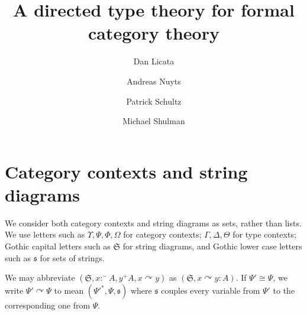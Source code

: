 \documentclass{amsart}
\title{A directed type theory for formal category theory}
\author{Dan Licata \and Andreas Nuyts \and Patrick Schultz \and Michael Shulman}
\def\p{^+} %
\def\m{^-}
\def\cat{\;\mathsf{cat}}
\def\flip#1{#1^*} %
\newcommand{\catctx}{\;\mathsf{catctx}}
\newcommand{\sdiag}{\;\mathsf{sdiag}}
\newcommand{\strs}[1]{\mathfrak{#1}}
\newcommand{\strto}{\curvearrowright}
\begin{document}
\maketitle

\section{Category contexts and string diagrams}
We consider both category contexts and string diagrams as sets, rather than lists. We use letters such as $\Upsilon, \Psi, \Phi, \Omega$ for category contexts; $\Gamma, \Delta, \Theta$ for type contexts; Gothic capital letters such as $\strs S$ for string diagrams, and Gothic lower case letters such as $\strs s$ for sets of strings.


We may abbreviate $(\strs S, x :\m A, y \p A, x \strto y)$ as $(\strs S, x \strto y : A)$. If $\Psi' \cong \Psi$, we write $\Psi' \strto \Psi$ to mean $(\flip{{\Psi'}}, \Psi, \strs s)$ where $\strs s$ couples every variable from $\Psi'$ to the corresponding one from $\Psi$.
\end{document}
